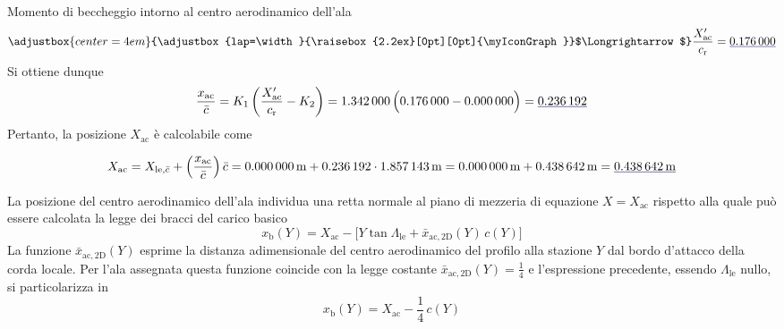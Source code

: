 \documentclass[[12pt,twoside]{book}
\begin{document}
\begin{myExampleX}{Momento di beccheggio intorno al centro aerodinamico dell'ala}{}
\[\adjustbox{center=4em}{%
  \adjustbox{lap=\width}{\raisebox{2.2ex}[0pt][0pt]{\myIconGraph}}$\Longrightarrow$%
}
%
\frac{X'_{\mathrm{ac}}}{c_\mathrm{r}}
  = \mathunderline{mydarkblue}{ \SI[round-precision=3]{\myXACOverChordRootDatcomWing}{} }
\]
%
Si ottiene dunque
\[
\frac{x_{\mathrm{ac}}}{\bar{c}} 
  = K_1 \left( \frac{X'_{\mathrm{ac}}}{c_\mathrm{r}} - K_2  \right)
  = \SI[round-precision=3]{\myKOneACDatcomWing}{} \,
    \Big(  
      \SI[round-precision=3]{\myXACOverChordRootDatcomWing}{} 
        - \SI[round-precision=0]{\myKTwoACDatcomWing}{}  
    \Big)
  = \mathunderline{mydarkblue}{ \SI[round-precision=3]{\myXsiACWing}{} } 
\]
%
Pertanto, la posizione $X_\mathrm{ac}$ è calcolabile come

\[
X_\mathrm{ac} 
  =
    X_{\mathrm{le},\bar{c}} + \left( \frac{x_{\mathrm{ac}}}{\bar{c}} \right) \bar{c}
=
    \SI[round-precision=0]{\myXMACLEToApexWingMT}{\metre}
      + \SI[round-precision=3]{\myXsiACWing}{}
        \cdot \SI[round-precision=2]{\myMACWingMT}{\metre}
      = \SI[round-precision=0]{\myXMACLEToApexWingMT}{\metre}
        + \SI[round-precision=2]{\myACWingToMACLEWingMT}{\metre} 
    = \mathunderline{mydarkblue}{ 
      \SI[round-precision=2]{\myACWingToApexWingMT}{\metre} 
    }%
\]

La posizione del centro aerodinamico dell'ala individua una retta normale al piano di mezzeria
di equazione $X=X_\mathrm{ac}$ rispetto alla quale può essere calcolata la legge dei bracci
del carico basico
\[
x_\mathrm{b}(Y) 
  = X_\mathrm{ac} 
    - \Big[ Y \tan \Lambda_\mathrm{le} + \bar{x}_{\mathrm{ac,2D}} (Y) \, c(Y) \Big]
\]
La funzione $\bar{x}_{\mathrm{ac,2D}}(Y)$ esprime la distanza adimensionale del centro 
aerodinamico del profilo alla stazione $Y$ dal bordo d'attacco della corda locale. 
Per l'ala assegnata questa funzione coincide con la legge costante
$\bar{x}_{\mathrm{ac,2D}}(Y) = \frac{1}{4}$ e l'espressione precedente,
essendo $\Lambda_\mathrm{le}$ nullo, si particolarizza in
\[
x_\mathrm{b}(Y) = X_\mathrm{ac} - \frac{1}{4} \, c(Y)
\]


\end{myExampleX}
\end{document}
